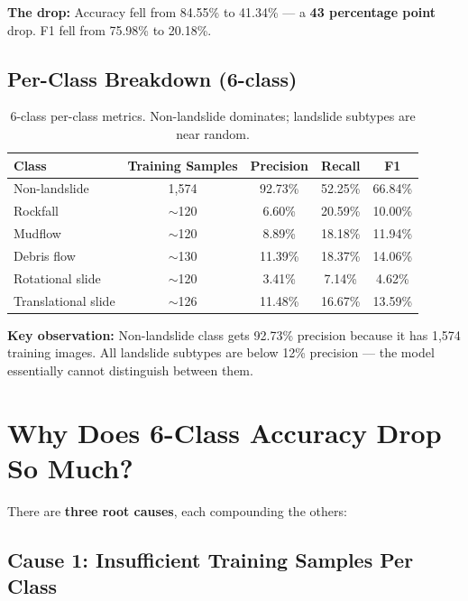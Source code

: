 \documentclass[12pt,a4paper]{article}
\begin{document}
\noindent\textbf{The drop:} Accuracy fell from 84.55\% to 41.34\% --- a \textbf{43 percentage point} drop. F1 fell from 75.98\% to 20.18\%.

\subsection*{Per-Class Breakdown (6-class)}

\begin{table}[h]
    \centering
    \renewcommand{\arraystretch}{1.2}
    \small
    \begin{tabular}{lcccc}
        \toprule
        \textbf{Class} & \textbf{Training Samples} & \textbf{Precision} & \textbf{Recall} & \textbf{F1} \\
        \midrule
        Non-landslide       & 1,574 & 92.73\% & 52.25\% & 66.84\% \\
        Rockfall             & $\sim$120 & 6.60\% & 20.59\% & 10.00\% \\
        Mudflow              & $\sim$120 & 8.89\% & 18.18\% & 11.94\% \\
        Debris flow          & $\sim$130 & 11.39\% & 18.37\% & 14.06\% \\
        Rotational slide     & $\sim$120 & 3.41\% & 7.14\% & 4.62\% \\
        Translational slide  & $\sim$126 & 11.48\% & 16.67\% & 13.59\% \\
        \bottomrule
    \end{tabular}
    \caption{6-class per-class metrics. Non-landslide dominates; landslide subtypes are near random.}
\end{table}

\noindent\textbf{Key observation:} Non-landslide class gets 92.73\% precision because it has 1,574 training images. All landslide subtypes are below 12\% precision --- the model essentially cannot distinguish between them.

\section{Why Does 6-Class Accuracy Drop So Much?}

There are \textbf{three root causes}, each compounding the others:

\subsection{Cause 1: Insufficient Training Samples Per Class}
\end{document}
